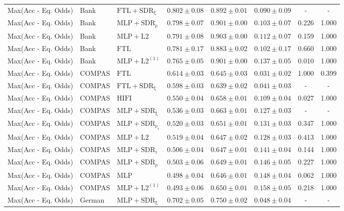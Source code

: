 \begin{table}[htbp]
\begin{tabular}{lllccccc}
Max(Acc - Eq. Odds) & Bank & $\mathrm{FTL+SDR_{\xi}}$ & $0.802 \pm0.08$ & $0.892 \pm0.01$ & $0.090 \pm0.09$ & - & - \\
Max(Acc - Eq. Odds) & Bank & $\mathrm{MLP+SDR_{\rho}}$ & $0.798 \pm0.07$ & $0.901 \pm0.00$ & $0.103 \pm0.07$ & 0.226 & 1.000 \\
Max(Acc - Eq. Odds) & Bank & $\mathrm{MLP+L2}$ & $0.791 \pm0.08$ & $0.903 \pm0.00$ & $0.112 \pm0.07$ & 0.159 & 1.000 \\
Max(Acc - Eq. Odds) & Bank & $\mathrm{FTL}$ & $0.781 \pm0.17$ & $0.883 \pm0.02$ & $0.102 \pm0.17$ & 0.660 & 1.000 \\
Max(Acc - Eq. Odds) & Bank & $\mathrm{MLP+L2^{(1)}}$ & $0.765 \pm0.05$ & $0.901 \pm0.00$ & $0.137 \pm0.05$ & 0.010 & 1.000 \\
Max(Acc - Eq. Odds) & COMPAS & $\mathrm{FTL}$ & $0.614 \pm0.03$ & $0.645 \pm0.03$ & $0.031 \pm0.02$ & 1.000 & 0.399 \\
Max(Acc - Eq. Odds) & COMPAS & $\mathrm{FTL+SDR_{\xi}}$ & $0.598 \pm0.03$ & $0.639 \pm0.02$ & $0.041 \pm0.03$ & - & - \\
Max(Acc - Eq. Odds) & COMPAS & $\mathrm{HIFI}$ & $0.550 \pm0.04$ & $0.658 \pm0.01$ & $0.109 \pm0.04$ & 0.027 & 1.000 \\
Max(Acc - Eq. Odds) & COMPAS & $\mathrm{MLP+SDR_{\xi}}$ & $0.536 \pm0.03$ & $0.663 \pm0.01$ & $0.127 \pm0.03$ & - & - \\
Max(Acc - Eq. Odds) & COMPAS & $\mathrm{MLP+SDR_{\rho_s}}$ & $0.520 \pm0.03$ & $0.651 \pm0.01$ & $0.131 \pm0.03$ & 0.347 & 1.000 \\
Max(Acc - Eq. Odds) & COMPAS & $\mathrm{MLP+L2}$ & $0.519 \pm0.04$ & $0.647 \pm0.02$ & $0.128 \pm0.03$ & 0.413 & 1.000 \\
Max(Acc - Eq. Odds) & COMPAS & $\mathrm{MLP+SDR_{\tau}}$ & $0.506 \pm0.04$ & $0.647 \pm0.01$ & $0.141 \pm0.04$ & 0.144 & 1.000 \\
Max(Acc - Eq. Odds) & COMPAS & $\mathrm{MLP+SDR_{\rho}}$ & $0.503 \pm0.06$ & $0.649 \pm0.01$ & $0.146 \pm0.05$ & 0.227 & 1.000 \\
Max(Acc - Eq. Odds) & COMPAS & $\mathrm{MLP}$ & $0.498 \pm0.04$ & $0.646 \pm0.01$ & $0.148 \pm0.04$ & 0.062 & 1.000 \\
Max(Acc - Eq. Odds) & COMPAS & $\mathrm{MLP+L2^{(1)}}$ & $0.493 \pm0.06$ & $0.650 \pm0.01$ & $0.158 \pm0.05$ & 0.218 & 1.000 \\
Max(Acc - Eq. Odds) & German & $\mathrm{MLP+SDR_{\xi}}$ & $0.702 \pm0.05$ & $0.750 \pm0.02$ & $0.048 \pm0.04$ & - & - \\

\end{tabular}
\end{table}
